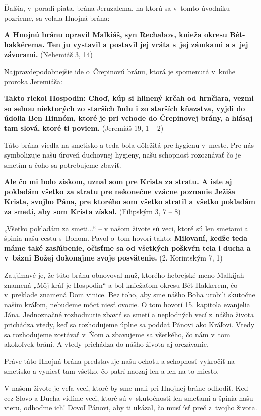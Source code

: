 Ďalšia, v~poradí piata, brána Jeruzalema, na ktorú sa v~tomto úvodníku pozrieme, sa volala Hnojná brána:

{\bf A Hnojnú bránu opravil Malkiáš, syn Rechabov, knieža okresu Bét-hakkérema. Ten ju vystavil a postavil jej vráta s~jej zámkami a s~jej závorami.} (Nehemiáš 3, 14)

Najpravdepodobnejšie ide o~Črepinovú bránu, ktorá je spomenutá v~knihe proroka Jeremiáša:

{\bf Takto riekol Hospodin: Choď, kúp si hlinený krčah od hrnčiara, vezmi so sebou niektorých zo starších ľudu i zo starších kňazstva, vyjdi do údolia Ben Hinnóm, ktoré je pri vchode do Črepinovej brány, a hlásaj tam slová, ktoré ti poviem.} (Jeremiáš 19, 1 -- 2)

Táto brána viedla na smetisko a teda bola dôležitá pre hygienu v~meste. Pre nás symbolizuje našu úroveň duchovnej hygieny, našu schopnosť rozoznávať čo je smetím a čoho sa potrebujeme zbaviť.

{\bf Ale čo mi bolo ziskom, uznal som pre Krista za stratu. A iste aj pokladám všetko za stratu pre nekonečne vzácne poznanie Ježiša Krista, svojho Pána, pre ktorého som všetko stratil a všetko pokladám za smeti, aby som Krista získal.} (Filipským 3, 7 -- 8)

„Všetko pokladám za smeti...“ -- v našom živote sú veci, ktoré sú len smeťami a špinia našu cestu s~Bohom. Pavol o~tom hovorí takto:
{\bf Milovaní, keďže teda máme také zasľúbenie, očisťme sa od všetkých poškvŕn tela i ducha a v~bázni Božej dokonajme svoje posvätenie.} (2. Korintským 7, 1)

Zaujímavé je, že túto bránu obnovoval muž, ktorého hebrejské meno Malkíjah znamená „Môj kráľ je Hospodin“ a bol kniežaťom okresu Bét-Hakkerem, čo v~preklade znamená Dom vinice. Bez toho, aby sme nášho Boha urobili skutočne naším kráľom, nebudeme môcť niesť ovocie. O tom hovorí 15. kapitola evanjelia Jána. Jednoznačné rozhodnutie zbaviť sa smetí a neplodných vecí z~nášho života prichádza vtedy, keď sa rozhodujeme úplne sa poddať Pánovi ako Kráľovi. Vtedy sa rozhodujeme zostávať v~Ňom a zbavujeme sa všetkého, čo nám v~tom akokoľvek bráni. A vtedy prichádza do nášho života aj orezávanie.

Práve táto Hnojná brána predstavuje našu ochotu a schopnosť vykročiť na smetisko a vyniesť tam všetko, čo patrí naozaj len a len na to miesto.

V našom živote je veľa vecí, ktoré by sme mali pri Hnojnej bráne odhodiť. Keď cez Slovo a Ducha vidíme veci, ktoré sú v~skutočnosti len smeťami a špinia našu vieru, odhoďme ich! Dovoľ Pánovi, aby ti ukázal, čo musí ísť preč z~tvojho života.

